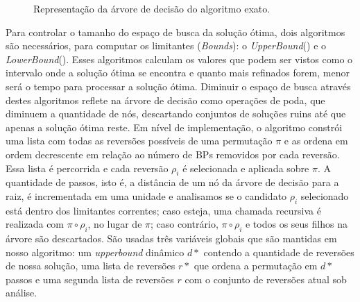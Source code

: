 


\begin{figure}[h]
    \centering
    \caption{Representação da árvore de decisão do algoritmo exato.}
    \label{DecisionTree}
\end{figure}

Para controlar o tamanho do espaço de busca da solução ótima, dois algoritmos são necessários, para computar os limitantes (\textit{Bounds}): o \textit{UpperBound}() e o \textit{LowerBound}(). Esses algoritmos calculam os valores que podem ser vistos como o intervalo onde a solução ótima se encontra e quanto mais refinados forem, menor será o tempo para processar a solução ótima. Diminuir o espaço de busca através destes algoritmos reflete na árvore de decisão como operações de poda, que diminuem a quantidade de nós, descartando conjuntos de soluções ruins até que apenas a solução ótima reste. Em nível de implementação, o algoritmo constrói uma lista com todas as reversões possíveis de uma permutação $\pi$ e as ordena em ordem decrescente em relação ao número de BPs removidos por cada reversão. Essa lista é percorrida e cada reversão $\rho_i$ é selecionada e aplicada sobre $\pi$. A quantidade de passos, isto é, a distância de um nó da árvore de decisão para a raiz, é incrementada em uma unidade e analisamos se o candidato $\rho_i$ selecionado está dentro dos limitantes correntes; caso esteja, uma chamada recursiva é realizada com $\pi \circ \rho_i$, no lugar de $\pi$; caso contrário, $\pi \circ \rho_i$ e todos os seus filhos na árvore são descartados. São usadas três variáveis globais que são mantidas em nosso algoritmo: um \textit{upperbound} dinâmico $d*$ contendo a quantidade de reversões de nossa solução, uma lista de reversões $r*$ que ordena a permutação em $d*$ passos e uma segunda lista de reversões $r$ com o conjunto de reversões atual sob análise.

